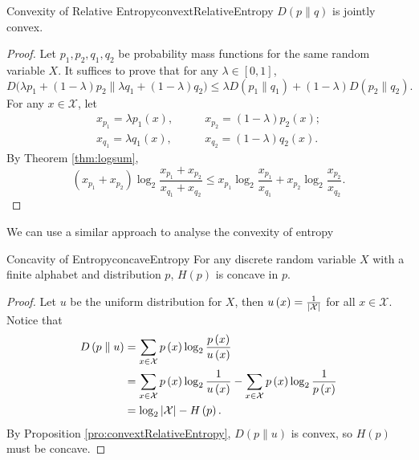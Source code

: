 \documentclass[math]{amznotes}
\theoremstyle{remark}
\begin{document}
\begin{probox}{Convexity of Relative Entropy}{convextRelativeEntropy}
    $D\left(p \parallel q\right)$ is jointly convex.
    \tcblower
    \begin{proof}
        Let $p_1, p_2, q_1, q_2$ be probability mass functions for the same random variable $X$. It suffices to prove that for any $\lambda \in \left[0, 1\right]$,
        \begin{equation*}
            D\bigl(\lambda p_1 + \left(1 - \lambda\right)p_2 \parallel \lambda q_1 + \left(1 - \lambda\right)q_2\bigr) \leq \lambda D\left(p_1 \parallel q_1\right) + \left(1 - \lambda\right)D\left(p_2 \parallel q_2\right).
        \end{equation*}
        For any $x \in \mathcal{X}$, let 
        \begin{align*}
            x_{p_1} = \lambda p_1\left(x\right), & \qquad x_{p_2} = \left(1- \lambda\right)p_2\left(x\right); \\
            x_{q_1} = \lambda q_1\left(x\right), & \qquad x_{q_2} = \left(1- \lambda\right)q_2\left(x\right).
        \end{align*}
        By Theorem \ref{thm:logsum},
        \begin{equation*}
            \left(x_{p_1} + x_{p_2}\right)\log_2\frac{x_{p_1} + x_{p_2}}{x_{q_1} + x_{q_2}} \leq x_{p_1}\log_2\frac{x_{p_1}}{x_{q_1}} + x_{p_2}\log_2\frac{x_{p_2}}{x_{q_2}}.
        \end{equation*}
    \end{proof}
\end{probox}
We can use a similar approach to analyse the convexity of entropy
\begin{probox}{Concavity of Entropy}{concaveEntropy}
    For any discrete random variable $X$ with a finite alphabet and distribution $p$, $H\left(p\right)$ is concave in $p$.
    \tcblower
    \begin{proof}
        Let $u$ be the uniform distribution for $X$, then $u\left(x\right) = \frac{1}{{\left\lvert {\mathcal{X}} \right\rvert}}$ for all $x \in \mathcal{X}$. Notice that 
        \begin{align*}
            D\left(p \parallel u\right) & = \sum_{x \in \mathcal{X}}p\left(x\right)\log_2\frac{p\left(x\right)}{u\left(x\right)} \\
            & = \sum_{x \in \mathcal{X}}p\left(x\right)\log_2\frac{1}{u\left(x\right)} - \sum_{x \in \mathcal{X}}p\left(x\right)\log_2\frac{1}{p\left(x\right)} \\
            & = \log_2{\left\lvert {\mathcal{X}} \right\rvert} - H\left(p\right).
        \end{align*}
        By Proposition \ref{pro:convextRelativeEntropy}, $D\left(p \parallel u\right)$ is convex, so $H\left(p\right)$ must be concave.
    \end{proof}
\end{probox}
\end{document}
